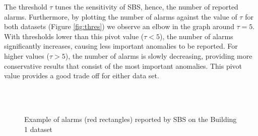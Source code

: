 The threshold $\tau$ tunes the sensitivity of SBS, hence, the number of reported alarms.  
Furthermore, by plotting the number of alarms against the value of $\tau$ for both datasets (Figure \ref{fig:thres}) we observe an 
elbow in the graph around $\tau=5$.
With thresholds lower than this pivot value ($\tau<5$), the number of alarms significantly increases, causing less important anomalies 
to be reported.  
For higher values ($\tau>5$), the number of alarms is slowly decreasing, providing more conservative results that consist of the 
most important anomalies.
This pivot value provides a good trade off for either data set.

\begin{figure}
   \hspace{.015\textwidth} %
   \hspace{.015\textwidth}  %
 \\ %
 \\  
\caption{Example of alarms (red rectangles) reported by SBS on the Building 1 dataset}
\end{figure}


